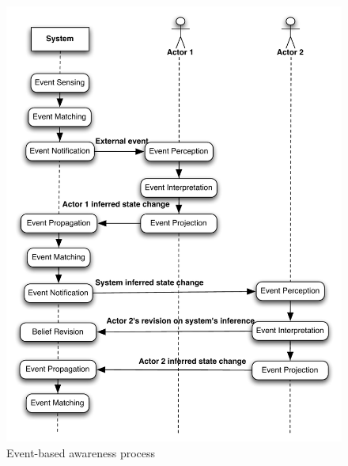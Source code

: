 \begin{figure}[htbp] %
   \centering
   \includegraphics[width=5.5in]{comp_framework.pdf} 
   \caption{Event-based awareness process}
   \label{fig:comp_framework}
\end{figure}




 

